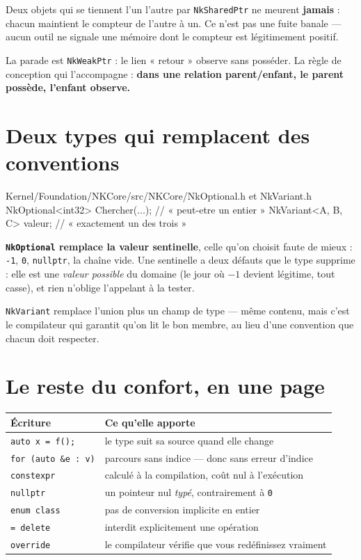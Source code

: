 \begin{nkpiege}[Le cycle]
Deux objets qui se tiennent l'un l'autre par \texttt{NkSharedPtr} ne meurent
\textbf{jamais} : chacun maintient le compteur de l'autre à un. Ce n'est pas une
fuite banale --- aucun outil ne signale une mémoire dont le compteur est
légitimement positif.

La parade est \texttt{NkWeakPtr} : le lien « retour » observe sans posséder. La
règle de conception qui l'accompagne : \textbf{dans une relation
parent/enfant, le parent possède, l'enfant observe.}
\end{nkpiege}

\section{Deux types qui remplacent des conventions}

\begin{nkcode}{Kernel/Foundation/NKCore/src/NKCore/NkOptional.h et NkVariant.h}
NkOptional<int32> Chercher(...);   // « peut-etre un entier »
NkVariant<A, B, C> valeur;         // « exactement un des trois »
\end{nkcode}

\begin{nkretenir}
\textbf{\texttt{NkOptional} remplace la valeur sentinelle}, celle qu'on choisit
faute de mieux : \texttt{-1}, \texttt{0}, \texttt{nullptr}, la chaîne vide. Une
sentinelle a deux défauts que le type supprime : elle est une \emph{valeur
possible} du domaine (le jour où $-1$ devient légitime, tout casse), et rien
n'oblige l'appelant à la tester.

\texttt{NkVariant} remplace l'union plus un champ de type --- même contenu, mais
c'est le compilateur qui garantit qu'on lit le bon membre, au lieu d'une
convention que chacun doit respecter.
\end{nkretenir}

\section{Le reste du confort, en une page}

\begin{center}
\begin{tabular}{@{}ll@{}}
\toprule
\textbf{Écriture} & \textbf{Ce qu'elle apporte} \\
\midrule
\texttt{auto x = f();} & le type suit sa source quand elle change \\
\texttt{for (auto \&e : v)} & parcours sans indice --- donc sans erreur d'indice \\
\texttt{constexpr} & calculé à la compilation, coût nul à l'exécution \\
\texttt{nullptr} & un pointeur nul \emph{typé}, contrairement à \texttt{0} \\
\texttt{enum class} & pas de conversion implicite en entier \\
\texttt{= delete} & interdit explicitement une opération \\
\texttt{override} & le compilateur vérifie que vous redéfinissez vraiment \\
\bottomrule
\end{tabular}
\end{center}

